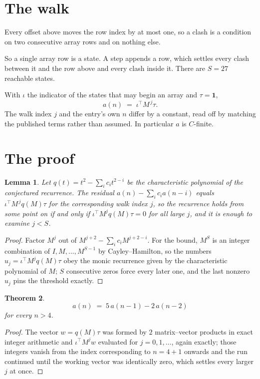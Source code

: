 \documentclass[11pt,a4paper]{article}
\theoremstyle{plain}
\newtheorem{theorem}{Theorem}
\newtheorem{lemma}[theorem]{Lemma}
\theoremstyle{definition}
\begin{document}
\section{The walk}

Every offset above moves the row index by at most one, so a clash is a condition on two
consecutive array rows and on nothing else.

So a single array row is a state. A step appends a row, which settles every clash between it
and the row above and every clash inside it. There are $S=27$ reachable states.

With $\iota$ the indicator of the states that may begin an array and $\tau=\mathbf{1}$,
\[
a(n)\;=\;\iota^{\!\top}M^{\,j}\tau .
\]
The walk index $j$ and the entry's own $n$ differ by a constant, read off by matching the
published terms rather than assumed. In particular $a$ is $C$-finite.

\section{The proof}

\begin{lemma}\label{lem:crit}
Let $q(t)=t^{2}-\sum_i c_it^{2-i}$ be the characteristic polynomial of the
conjectured recurrence. The residual $a(n)-\sum_ic_ia(n-i)$ equals
$\iota^{\!\top}M^{\,j}q(M)\tau$ for the corresponding walk index $j$, so the recurrence
holds from some point on if and only if $\iota^{\!\top}M^{j}q(M)\tau=0$ for all large $j$,
and it is enough to examine $j<S$.
\end{lemma}

\begin{proof}
Factor $M^{j}$ out of $M^{j+2}-\sum_ic_iM^{j+2-i}$. For the bound, $M^{S}$
is an integer combination of $I,M,\dots,M^{S-1}$ by Cayley--Hamilton, so the numbers
$u_j=\iota^{\!\top}M^{j}q(M)\tau$ obey the monic recurrence given by the characteristic
polynomial of $M$; $S$ consecutive zeros force every later one, and the last nonzero $u_j$
pins the threshold exactly.
\end{proof}

\begin{theorem}
\[
a(n)\;=\;5\,a(n-1) - 2\,a(n-2)
\]
for every $n>4$.
\end{theorem}

\begin{proof}
The vector $w=q(M)\tau$ was formed by $2$ matrix--vector products in exact integer
arithmetic and $\iota^{\!\top}M^{j}w$ evaluated for $j=0,1,\dots$, again exactly; those
integers vanish from the index corresponding to $n=4+1$ onwards and the run continued
until the working vector was identically zero, which settles every larger $j$ at once.
\end{proof}
\end{document}
